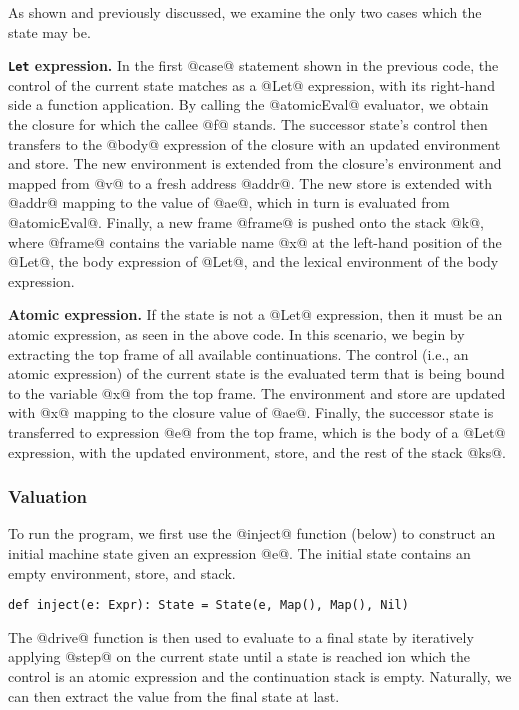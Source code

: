 \documentclass[acmsmall,review,anonymous]{acmart}\settopmatter{printfolios=true,printccs=false,printacmref=false}
\begin{document}
As shown and previously discussed, we examine the only two cases which the state may be.

\textbf{\texttt{Let} expression.} In the first @case@ statement shown in the previous code,
the control of the current state matches as a @Let@ expression, with its right-hand side a
function application.
By calling the @atomicEval@ evaluator, we obtain the closure for which the callee @f@ stands.
The successor state's control then transfers to the @body@ expression of the closure
with an updated environment and store. The new environment is extended
from the closure's environment and mapped from @v@ to a fresh address @addr@.
The new store is extended with @addr@ mapping to the value of @ae@,
which in turn is evaluated from @atomicEval@.
Finally, a new frame @frame@ is pushed onto the stack @k@, where
@frame@ contains the variable name @x@ at the left-hand position of the @Let@,
the body expression of @Let@, and the lexical environment of the body expression.

\textbf{Atomic expression.} If the state is not a @Let@ expression, then it must be
an atomic expression, as seen in the above code. In this scenario,
we begin by extracting the top frame of all available continuations.
The control (i.e., an atomic expression) of the current state is the evaluated term
that is being bound to the variable @x@ from the top frame.
The environment and store are updated with @x@ mapping to the closure value of @ae@.
Finally, the successor state is transferred to expression @e@ from the top frame,
which is the body of a @Let@ expression, with the updated environment, store, and
the rest of the stack @ks@.

\subsubsection{Valuation}

To run the program, we first use the @inject@ function (below) to construct an initial machine
state given an expression @e@. The initial state contains an empty environment,
store, and stack.
\begin{lstlisting}
def inject(e: Expr): State = State(e, Map(), Map(), Nil)
\end{lstlisting}

The @drive@ function is then used to evaluate
to a final state by iteratively applying @step@ on the current state until a state is reached
ion which the control is an atomic expression and the continuation stack is empty.
Naturally, we can then extract the value from the final state at last.
\end{document}
